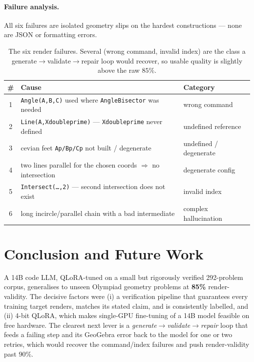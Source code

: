\documentclass[11pt]{article}
\begin{document}
\paragraph{Failure analysis.} All six failures are isolated geometry slips on
the hardest constructions --- none are JSON or formatting errors.
\begin{table}[h]
\centering
\begin{tabular}{cll}
\toprule
\# & Cause & Category \\
\midrule
1 & \texttt{Angle(A,B,C)} used where \texttt{AngleBisector} was needed & wrong command \\
2 & \texttt{Line(A,Xdoubleprime)} --- \texttt{Xdoubleprime} never defined & undefined reference \\
3 & cevian feet \texttt{Ap/Bp/Cp} not built / degenerate & undefined / degenerate \\
4 & two lines parallel for the chosen coords $\Rightarrow$ no intersection & degenerate config \\
5 & \texttt{Intersect(\ldots,2)} --- second intersection does not exist & invalid index \\
6 & long incircle/parallel chain with a bad intermediate & complex hallucination \\
\bottomrule
\end{tabular}
\caption{The six render failures. Several (wrong command, invalid index) are the
class a generate$\to$validate$\to$repair loop would recover, so usable quality is
slightly above the raw $85\%$.}
\end{table}

\section{Conclusion and Future Work}
A 14B code LLM, QLoRA-tuned on a small but rigorously verified 292-problem
corpus, generalises to unseen Olympiad geometry problems at \textbf{85\%}
render-validity. The decisive factors were (i) a verification pipeline that
guarantees every training target renders, matches its stated claim, and is
consistently labelled, and (ii) 4-bit QLoRA, which makes single-GPU fine-tuning
of a 14B model feasible on free hardware. The clearest next lever is a
\emph{generate$\to$validate$\to$repair} loop that feeds a failing step and its
GeoGebra error back to the model for one or two retries, which would recover
the command/index failures and push render-validity past $90\%$.
\end{document}
